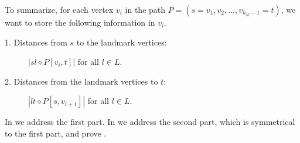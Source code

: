 





To summarize, for each vertex $v_i$ in the path $P = (s=v_1, v_2, \ldots, v_{h_{st}-1}=t)$, we want to store the following information in $v_i$. %
\begin{description}
    \item[1. Distances from $s$ to the landmark vertices:] $|sl \diamond P[v_{i},t]|$ for all $l \in L$.
    \item[2. Distances from the landmark vertices to $t$:] $|lt \diamond P[s,v_{i+1}]|$  for all $l \in L$.
\end{description}


In  we address the first part. In  we address the second part, which is symmetrical to the first part, and prove . 

